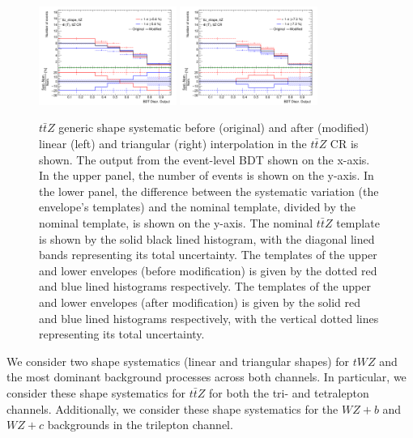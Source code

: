 \begin{figure}[h!]
  \includegraphics[width=0.4\textwidth]{figures/lep4_ttZ_4T_ttz_shape_20percent_linear.png}
  \includegraphics[width=0.4\textwidth]{figures/lep4_ttZ_4T_ttz_shape_20percent_triangular.png}
  \centering
  
  \caption{$t\bar{t}Z$ generic shape systematic before (original) and after (modified) linear (left) and triangular (right) interpolation in the $t\bar{t}Z$ CR is shown. The output from the event-level BDT shown on the x-axis. In the upper panel, the number of events is shown on the y-axis. In the lower panel, the difference between the systematic variation (the envelope's templates) and the nominal template, divided by the nominal template, is shown on the y-axis. The nominal $t\bar{t}Z$ template is shown by the solid black lined histogram, with the diagonal lined bands representing its total uncertainty. The templates of the upper and lower envelopes (before modification) is given by the dotted red and blue lined histograms respectively. The templates of the upper and lower envelopes (after modification) is given by the solid red and blue lined histograms respectively, with the vertical dotted lines representing its total uncertainty. }
  \label{fig:genericShapeSystexamples}
\end{figure}

We consider two shape systematics (linear and triangular shapes) for $tWZ$ and the most dominant background processes across both channels. In particular, we consider these shape systematics for $t\bar{t}Z$ for both the tri- and tetralepton channels. Additionally, we consider these shape systematics for the $WZ+b$ and $WZ+c$ backgrounds in the trilepton channel.



